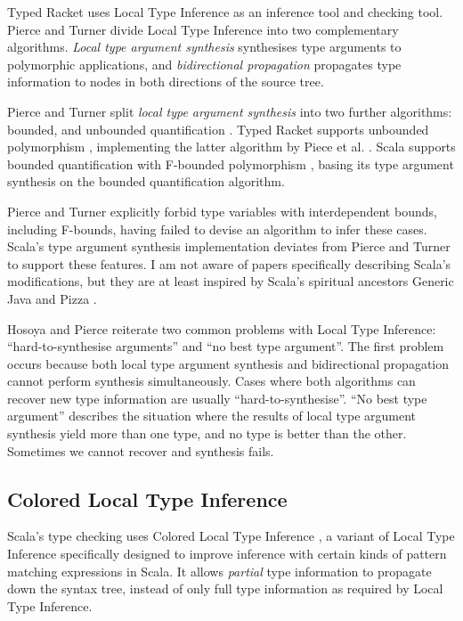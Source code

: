 \documentclass[12pt,a4paper]{article}
\begin{document}
Typed Racket uses Local Type Inference \cite{Pierce:2000:LTI:345099.345100}
as an inference tool and checking tool. Pierce and Turner
\cite{Pierce:2000:LTI:345099.345100} divide Local Type Inference into
two complementary algorithms. \emph{Local type argument synthesis}
synthesises type arguments to polymorphic applications, and \emph{bidirectional
propagation} propagates type information to nodes in both directions of the source tree.

Pierce and Turner split \emph{local type argument synthesis} into two further
algorithms: bounded, and unbounded quantification \cite{Pierce:2000:LTI:345099.345100}. 
Typed Racket 
supports unbounded polymorphism \cite{SAMTH:dissertation}, implementing the latter algorithm by Piece et al. .
Scala supports bounded quantification with F-bounded polymorphism \cite{Canning:1989:FPO:99370.99392},
basing its type argument synthesis on the bounded quantification algorithm.

Pierce and Turner explicitly forbid \cite{Pierce:2000:LTI:345099.345100}
type variables with interdependent bounds, including
F-bounds, having failed to devise an algorithm to infer these cases.
Scala's type argument synthesis implementation deviates from Pierce and Turner to support these features.
I am not aware of papers specifically describing Scala's modifications, but they are at least inspired by
Scala's spiritual ancestors Generic Java \cite{Bracha98gj:extending} and Pizza \cite{Odersky97pizzainto}.

Hosoya and Pierce \cite{Hosoya99howgood} reiterate two common problems with Local Type Inference:
``hard-to-synthesise arguments'' and ``no best type argument''. The first problem occurs because
both local type argument synthesis and bidirectional propagation cannot perform synthesis
simultaneously. Cases where both algorithms can recover new type information are usually ``hard-to-synthesise''.
``No best type argument'' describes the situation where the results of local
type argument synthesis yield more than one type, and no type is better than the other. Sometimes we cannot recover and synthesis
fails.

\subsection{Colored Local Type Inference}

Scala's type checking uses Colored Local Type Inference \cite{Odersky:2001:CLT:373243.360207},
a variant of Local Type Inference \cite{Pierce:2000:LTI:345099.345100} specifically designed to
improve inference with certain kinds of pattern matching expressions in Scala. It allows
\emph{partial} type information to propagate down the syntax tree, instead of only full type information
as required by Local Type Inference.
\end{document}

